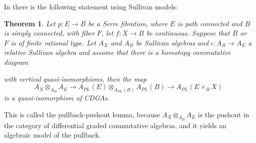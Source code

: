 \documentclass{scrartcl}
\theoremstyle{plain}
\newtheorem{theorem}{Theorem}[section]
\theoremstyle{definition}
\newcommand{\APL}{A_{PL}}
\newcommand{\from}{\leftarrow}
\begin{document}
In \cite[2.4]{hess2007rational} there is the following statement using Sullivan models:
\begin{theorem}\label{thm:pullback-pushout-sullivan}
    Let $p\colon E\to B$ be a Serre fibration, where $E$ is path connected and $B$ is simply connected, with fiber $F$, let $f\colon X\to B$ be continuous. Suppose that $B$ or $F$ is of finite rational type. Let $A_X$ and $A_B$ be Sullivan algebras and $\iota\colon A_B\to A_E$ a relative Sullivan algebra and assume that there is a homotopy commutative diagram
    \begin{center}
    \end{center}
    with vertical quasi-isomorphisms, then the map
    $$A_X\otimes_{A_B} A_E \to \APL(E)\otimes_{\APL(B)}\APL(B) \to \APL(E\times_B X)$$
    is a quasi-isomorphism of CDGAs.
\end{theorem}
This is called the pullback-pushout lemma, because $A_X\otimes_{A_B} A_E$ is the pushout in the category of differential graded commutative algebras, and it yields an algebraic model of the pullback.


    
\end{document}
